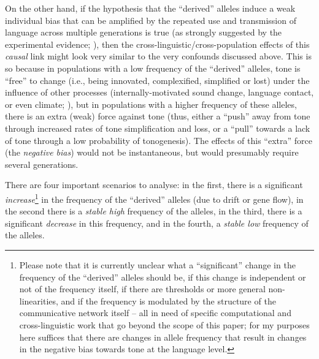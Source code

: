 \documentclass[twoside,onecolumn]{article}
\begin{document}
On the other hand, if the hypothesis that the ``derived'' alleles induce a weak individual bias that can be amplified by the repeated use and transmission of language across multiple generations \citep{dediu_ladd_2007,dediu_humbiol_2011,ladd_bioling_2008} is true (as strongly suggested by the experimental evidence; \citealp{wong_plosone_2012,wong_sciadv_2020}), then the cross-linguistic/cross-population effects of this \emph{causal} link might look very similar to the very confounds discussed above.
This is so because in populations with a low frequency of the ``derived'' alleles, tone is ``free'' to change (i.e., being innovated, complexified, simplified or lost) under the influence of other processes (internally-motivated sound change, language contact, or even climate; \citealp{yip_tone_2002,hombert_tone_1979,everett_language_2016}), but in populations with a higher frequency of these alleles, there is an extra (weak) force against tone (thus, either a ``push'' away from tone through increased rates of tone simplification and loss, or a ``pull'' towards a lack of tone through a low probability of tonogenesis).
The effects of this ``extra'' force (the \emph{negative bias}) would not be instantaneous, but would presumably require several generations.

There are four important scenarios to analyse: in the first, there is a significant \emph{increase}\footnote{Please note that it is currently unclear what a ``significant'' change in the frequency of the ``derived'' alleles should be, if this change is independent or not of the frequency itself, if there are thresholds or more general non-linearities, and if the frequency is modulated by the structure of the communicative network itself \citep{dediu_jtb_2008,dediu_jtb_2009,josserand_frontiers_2020} -- all in need of specific computational and cross-linguistic work that go beyond the scope of this paper; for my purposes here suffices that there are changes in allele frequency that result in changes in the negative bias towards tone at the language level.} in the frequency of the ``derived'' alleles (due to drift or gene flow), in the second there is a \emph{stable high} frequency of the alleles, in the third, there is a significant \emph{decrease} in this frequency, and in the fourth, a \emph{stable low} frequency of the alleles.
\end{document}

